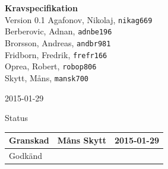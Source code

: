 \documentclass[11pt]{article}
\date{}
\begin{document}
\begin{titlepage}
\begin{center}
{\Large\bfseries Kravspecifikation}\\
%
\vspace{2\baselineskip}
%
Version 0.1
\vspace{2\baselineskip}
%
Agafonov, Nikolaj, 
\texttt{nikag669}
\\
Berberovic, Adnan, 
\texttt{adnbe196}
\\
Brorsson, Andreas, 
\texttt{andbr981}
\\
Fridborn, Fredrik, 
\texttt{frefr166}
\\
Oprea, Robert, 
\texttt{robop806}
\\
Skytt, Måns, 
\texttt{mansk700}

\vspace{2\baselineskip}
2015-01-29

\vspace{25\baselineskip}
Status
\begin{longtable}{|l|l|l|} \hline

Granskad &
Måns Skytt &
2015-01-29 \\ \hline
Godkänd &
 &
 \\ \hline
\end{longtable}

\end{center}
\end{titlepage}
\end{document}
